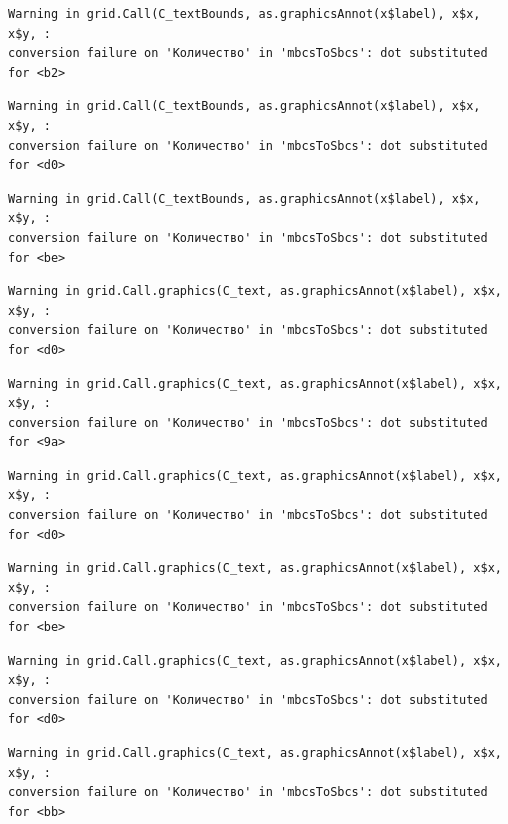 \documentclass[
  letterpaper,
]{scrbook}
\theoremstyle{definition}
\theoremstyle{remark}
\begin{document}
\begin{verbatim}
Warning in grid.Call(C_textBounds, as.graphicsAnnot(x$label), x$x, x$y, :
conversion failure on 'Количество' in 'mbcsToSbcs': dot substituted for <b2>
\end{verbatim}

\begin{verbatim}
Warning in grid.Call(C_textBounds, as.graphicsAnnot(x$label), x$x, x$y, :
conversion failure on 'Количество' in 'mbcsToSbcs': dot substituted for <d0>
\end{verbatim}

\begin{verbatim}
Warning in grid.Call(C_textBounds, as.graphicsAnnot(x$label), x$x, x$y, :
conversion failure on 'Количество' in 'mbcsToSbcs': dot substituted for <be>
\end{verbatim}

\begin{verbatim}
Warning in grid.Call.graphics(C_text, as.graphicsAnnot(x$label), x$x, x$y, :
conversion failure on 'Количество' in 'mbcsToSbcs': dot substituted for <d0>
\end{verbatim}

\begin{verbatim}
Warning in grid.Call.graphics(C_text, as.graphicsAnnot(x$label), x$x, x$y, :
conversion failure on 'Количество' in 'mbcsToSbcs': dot substituted for <9a>
\end{verbatim}

\begin{verbatim}
Warning in grid.Call.graphics(C_text, as.graphicsAnnot(x$label), x$x, x$y, :
conversion failure on 'Количество' in 'mbcsToSbcs': dot substituted for <d0>
\end{verbatim}

\begin{verbatim}
Warning in grid.Call.graphics(C_text, as.graphicsAnnot(x$label), x$x, x$y, :
conversion failure on 'Количество' in 'mbcsToSbcs': dot substituted for <be>
\end{verbatim}

\begin{verbatim}
Warning in grid.Call.graphics(C_text, as.graphicsAnnot(x$label), x$x, x$y, :
conversion failure on 'Количество' in 'mbcsToSbcs': dot substituted for <d0>
\end{verbatim}

\begin{verbatim}
Warning in grid.Call.graphics(C_text, as.graphicsAnnot(x$label), x$x, x$y, :
conversion failure on 'Количество' in 'mbcsToSbcs': dot substituted for <bb>
\end{verbatim}
\end{document}

